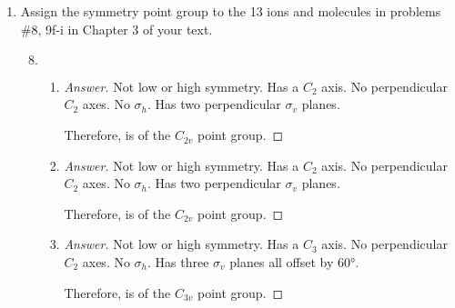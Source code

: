 \documentclass[../psets.tex]{subfiles}
\begin{document}
\begin{enumerate}[label={\Roman*)}]
\begin{enumerate}[label={\textbf{3.\arabic*}}]
\begin{center}
        \end{center}
        \setcounter{enumii}{28}
        \item Sketch the most likely structure of  and explain your reasoning.
        \begin{center}
        \end{center}
        \begin{proof}[Answer]
            Bromine is more electropositive than chlorine. Thus, by Bent's rule, the bromines will bond to the hybrid orbitals with greater $s$-character (the equatorial $sp^2$ ones) first.
        \end{proof}
    \end{enumerate}
    \newpage
    \item Assign the symmetry point group to the 13 ions and molecules in problems \#8, 9f-i in Chapter 3 of your text.
    \begin{enumerate}[label={\textbf{3.\arabic*}}]
        \setcounter{enumii}{7}
        \item ${\color{white}x}$
        \begin{enumerate}[label={\textbf{\alph*.}}]
            \item {}
            \begin{proof}[Answer]
                Not low or high symmetry. Has a $C_2$ axis. No perpendicular $C_2$ axes. No $\sigma_h$. Has two perpendicular $\sigma_v$ planes.\par
                Therefore,  is of the $C_{2v}$ point group.
            \end{proof}
            \item {}
            \begin{proof}[Answer]
                Not low or high symmetry. Has a $C_2$ axis. No perpendicular $C_2$ axes. No $\sigma_h$. Has two perpendicular $\sigma_v$ planes.\par
                Therefore,  is of the $C_{2v}$ point group.
            \end{proof}
            \item {}
            \begin{proof}[Answer]
                Not low or high symmetry. Has a $C_3$ axis. No perpendicular $C_2$ axes. No $\sigma_h$. Has three $\sigma_v$ planes all offset by $\ang{60}$.\par
                Therefore,  is of the $C_{3v}$ point group.

\end{proof}
\end{enumerate}
\end{enumerate}
\end{enumerate}
\end{document}
